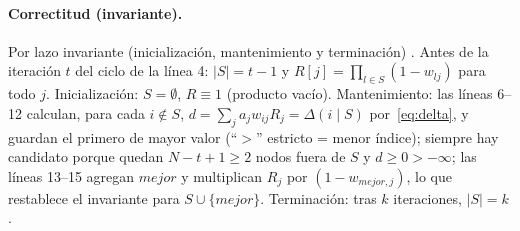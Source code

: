 \paragraph{Correctitud (invariante).} Por lazo invariante (inicialización, mantenimiento y terminación) \cite[§2.3]{notas}. Antes de la iteración $t$ del ciclo de la línea 4: $|S|=t-1$ y $R[j]=\prod_{l\in S}(1-w_{lj})$ para todo $j$. Inicialización: $S=\emptyset$, $R\equiv1$ (producto vacío). Mantenimiento: las líneas 6–12 calculan, para cada $i\notin S$, $d=\sum_ja_jw_{ij}R_j=\Delta(i\mid S)$ por~\eqref{eq:delta}, y guardan el primero de mayor valor (``$>$'' estricto = menor índice); siempre hay candidato porque quedan $N-t+1\ge2$ nodos fuera de $S$ y $d\ge0>-\infty$; las líneas 13–15 agregan $mejor$ y multiplican $R_j$ por $(1-w_{mejor,j})$, lo que restablece el invariante para $S\cup\{mejor\}$. Terminación: tras $k$ iteraciones, $|S|=k$.


